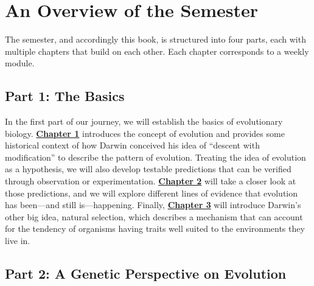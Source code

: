 \documentclass[
]{book}
\begin{document}
\hypertarget{an-overview-of-the-semester}{%
\section*{An Overview of the Semester}\label{an-overview-of-the-semester}}

The semester, and accordingly this book, is structured into four parts, each with multiple chapters that build on each other. Each chapter corresponds to a weekly module.

\hypertarget{part-1-the-basics}{%
\subsection*{Part 1: The Basics}\label{part-1-the-basics}}

In the first part of our journey, we will establish the basics of evolutionary biology. \href{what-evolution-is.html}{\textbf{Chapter 1}} introduces the concept of evolution and provides some historical context of how Darwin conceived his idea of ``descent with modification'' to describe the pattern of evolution. Treating the idea of evolution as a hypothesis, we will also develop testable predictions that can be verified through observation or experimentation. \href{evidence-for-evolution.html}{\textbf{Chapter 2}} will take a closer look at those predictions, and we will explore different lines of evidence that evolution has been---and still is---happening. Finally, \href{natural-selection-a-mechanism-for-change.html}{\textbf{Chapter 3}} will introduce Darwin's other big idea, natural selection, which describes a mechanism that can account for the tendency of organisms having traits well suited to the environments they live in.

\hypertarget{part-2-a-genetic-perspective-on-evolution}{%
\subsection*{Part 2: A Genetic Perspective on Evolution}\label{part-2-a-genetic-perspective-on-evolution}}
\end{document}
